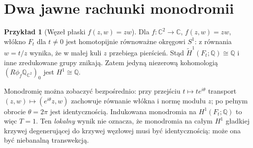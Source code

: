 \documentclass[11pt,a4paper,oneside]{report}
\newcommand{\C}{\mathbb{C}}
\newcommand{\Q}{\mathbb{Q}}
\theoremstyle{plain}
\theoremstyle{definition}
\newtheorem{przyklad}[twierdzenie]{Przykład}
\theoremstyle{remark}
\begin{document}
\section{Dwa jawne rachunki monodromii}
\begin{przyklad}[Węzeł płaski $f(z,w)=zw$]
\label{ex:node-monodromy-xiv}
Dla $f:\C^2\to\C$, $f(z,w)=zw$, włókno
$F_t$ dla $t\ne0$ jest homotopijnie równoważne
okręgowi $S^1$: z równania $w=t/z$ wynika,
że w małej kuli $z$ przebiega pierścień.
Stąd $\widetilde H^1(F_t;\Q)\cong\Q$
i inne zredukowane grupy znikają.
Zatem jedyną niezerową kohomologią
$(R\phi_f\Q_{\C^2})_0$ jest $H^1\cong\Q$.

Monodromię można zobaczyć bezpośrednio:
przy przejściu $t\mapsto te^{i\theta}$
transport $(z,w)\mapsto(e^{i\theta}z,w)$
zachowuje równanie włókna i normę modułu $z$;
po pełnym obrocie $\theta=2\pi$ jest identycznością.
Indukowana monodromia na $H^1(F_t;\Q)$ to więc $T=1$.
Ten \emph{lokalny} wynik nie oznacza, że monodromia
na całym $H^1$ gładkiej krzywej degenerującej
do krzywej węzłowej musi być identycznością:
może ona być niebanalną transwekcją.
\end{przyklad}
\end{document}
